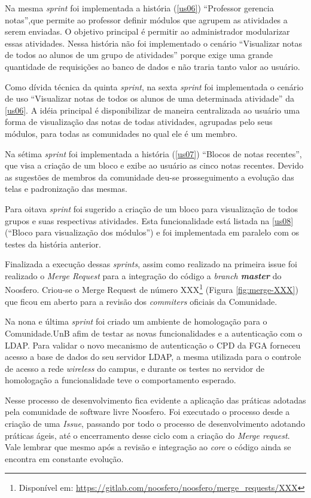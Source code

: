 Na mesma \textit{sprint} foi implementada a história (\ref{us06}) ``Professor gerencia notas'',que permite ao professor definir módulos que agrupem as atividades a serem enviadas. O objetivo principal é permitir ao administrador modularizar essas atividades. Nessa história não foi implementado o cenário ``Visualizar notas de todos ao alunos de um grupo de atividades'' porque exige uma grande quantidade de requisições ao banco de dados e não traria tanto valor ao usuário.

Como dívida técnica da quinta \textit{sprint}, na sexta \textit{sprint} foi implementada o cenário de uso ``Visualizar notas de todos os alunos de uma determinada atividade'' da \ref{us06}. A idéia principal é disponibilizar de maneira centralizada ao usuário uma forma de visualização das notas de todas atividades, agrupadas pelo seus módulos, para todas as comunidades no qual ele é um membro.

Na sétima \textit{sprint} foi implementada a história (\ref{us07}) ``Blocos de notas recentes'', que visa a criação de um bloco e exibe ao usuário as cinco notas recentes. Devido as sugestões de membros da comunidade deu-se prosseguimento a evolução das telas e padronização das mesmas.

Para oitava \textit{sprint} foi sugerido a criação de um bloco para visualização de todos grupos e suas respectivas atividades. Esta funcionalidade está listada na \ref{us08} (``Bloco para visualização dos módulos'') e foi implementada em paralelo com os testes da história anterior.

Finalizada a execução dessas \textit{sprints}, assim como realizado na primeira issue foi realizado o \textit{Merge Request} para a integração do código a \textit{branch \textbf{master}} do Noosfero. Criou-se o Merge Request de número XXX\footnote{Disponível em: \url{https://gitlab.com/noosfero/noosfero/merge_requests/XXX}} (Figura \ref{fig:merge-XXX}) que ficou em aberto para a revisão dos \textit{commiters} oficiais da Comunidade.

Na nona e última \textit{sprint} foi criado um ambiente de homologação para o Comunidade.UnB afim de testar as novas funcionalidades e a autenticação com o LDAP. Para validar o novo mecanismo de autenticação o CPD da FGA forneceu acesso a base de dados do seu servidor LDAP, a mesma utilizada para o controle de acesso a rede \textit{wireless} do campus, e durante os testes no servidor de homologação a funcionalidade teve o comportamento esperado.

Nesse processo de desenvolvimento fica evidente a aplicação das práticas adotadas pela comunidade de software livre Noosfero. Foi executado o processo desde a criação de uma \textit{Issue}, passando por todo o processo de desenvolvimento adotando práticas ágeis, até o encerramento desse ciclo com a criação do \textit{Merge request}. Vale lembrar que mesmo após a revisão e integração ao \textit{core} o código ainda se encontra em constante evolução.

